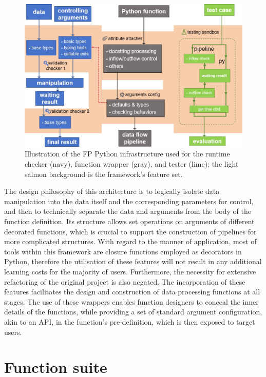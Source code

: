 \documentclass[a4paper,12pt]{article}
\begin{document}
\begin{figure}[htbp]
  \centering
  \includegraphics[scale=0.55]{frame.jpg}
  \caption{Illustration of the FP Python infrastructure used for the runtime checker (navy), function wrapper (gray), and tester (lime); the light salmon background is the framework's feature set.}
  \label{tag3}
\end{figure}

The design philosophy of this architecture is to logically isolate data manipulation into the data itself and the corresponding parameters for control, and then to technically separate the data and arguments from the body of the function definition. Its structure allows set operations on arguments of different decorated functions, which is crucial to support the construction of pipelines for more complicated structures. With regard to the manner of application, most of tools within this framework are closure functions employed as decorators in Python, therefore the utilisation of these features will not result in any additional learning costs for the majority of users. Furthermore, the necessity for extensive refactoring of the original project is also negated. The incorporation of these features facilitates the design and construction of data processing functions at all stages. The use of these wrappers enables function designers to conceal the inner details of the functions, while providing a set of standard argument configuration, akin to an API, in the function's pre-definition, which is then exposed to target users.\par

\section*{Function suite}
\end{document}
